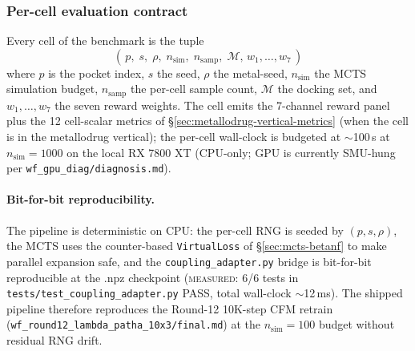 \subsubsection{Per-cell evaluation contract}
\label{sec:end-to-end-cell}

Every cell of the benchmark is the tuple
\begin{equation}
  \label{eq:end-to-end-cell}
  (\, p,\; s,\; \rho,\; n_{\mathrm{sim}},\; n_{\mathrm{samp}},\; \mathcal{M},\, w_1,\ldots,w_7 \,)
\end{equation}
where $p$ is the pocket index, $s$ the seed, $\rho$ the
metal-seed, $n_{\mathrm{sim}}$ the MCTS simulation budget,
$n_{\mathrm{samp}}$ the per-cell sample count, $\mathcal{M}$
the docking set, and $w_1,\ldots,w_7$ the seven reward
weights.  The cell emits the 7-channel reward panel plus
the 12 cell-scalar metrics of
\S\ref{sec:metallodrug-vertical-metrics} (when the cell is
in the metallodrug vertical); the per-cell wall-clock is
budgeted at $\sim$100\,s at $n_{\mathrm{sim}}=1000$ on the
local RX 7800 XT (CPU-only; GPU is currently SMU-hung per
\texttt{wf\_gpu\_diag/diagnosis.md}).

\paragraph{Bit-for-bit reproducibility.}
The pipeline is deterministic on CPU: the per-cell RNG is
seeded by $(p, s, \rho)$, the MCTS uses the counter-based
\texttt{VirtualLoss} of \S\ref{sec:mcts-betanf} to make
parallel expansion safe, and the
\texttt{coupling\_adapter.py} bridge is bit-for-bit
reproducible at the .npz checkpoint
(\textsc{measured}: 6/6 tests in
\texttt{tests/test\_coupling\_adapter.py} PASS, total
wall-clock $\sim$12\,ms).  The shipped pipeline therefore
reproduces the Round-12 10K-step CFM retrain
(\texttt{wf\_round12\_lambda\_patha\_10x3/final.md}) at the
$n_{\mathrm{sim}}=100$ budget without residual RNG drift.


\makeatletter
\let\cite\WForigCiteThreeSix
\makeatother
